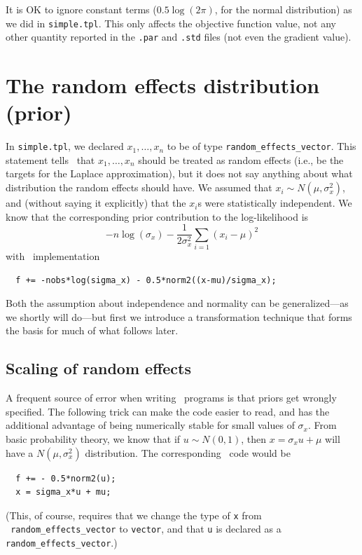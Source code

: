 \documentclass{admbmanual}
\begin{document}
It is OK to ignore constant terms ($0.5\log(2\pi)$, for the normal distribution) as we did in \texttt{simple.tpl}.
This only affects the objective function value, not any other quantity reported in the \texttt{.par} and \texttt{.std} files
(not even the gradient value).


\section{The random effects distribution (prior)}

In \texttt{simple.tpl}, we declared $x_{1},\ldots ,x_{n}$ to be of type \texttt{random\_effects\_vector}. This
statement tells \scAB\ that $x_{1},\ldots ,x_{n}$ should be treated as random effects (i.e., be the targets for the
Laplace approximation), but it does not say anything about what distribution the random effects should have. 
We assumed that $x_i\sim N(\mu ,\sigma_{x}^{2})$, and (without saying it explicitly)
that the $x_i$s were statistically independent. We know that the corresponding prior contribution to the
log-likelihood is
\[
-n\log (\sigma_{x})-\frac{1}{2\sigma_x^2}\sum_{i=1}\left( x_i-\mu \right) ^{2}
\]
with \scAB\ implementation
\begin{lstlisting}
  f += -nobs*log(sigma_x) - 0.5*norm2((x-mu)/sigma_x);
\end{lstlisting}
Both the assumption about independence and normality can be generalized---as we shortly will do---but first we introduce a transformation technique that forms the basis for much of what follows later.


\subsection{Scaling of random effects}

A frequent source of error when writing \scAR\ programs is that priors get
wrongly specified. The following trick can make the code easier to read, and
has the additional advantage of being numerically stable for small values of
$\sigma_{x}$. From basic probability theory, we know that if $u\sim N(0,1)$,
then $x=\sigma_{x}u+\mu$ will have a $N(\mu ,\sigma_{x}^{2})$ distribution.
The corresponding \scAB\ code would be
\begin{lstlisting}
  f += - 0.5*norm2(u);
  x = sigma_x*u + mu;
\end{lstlisting}
(This, of course, requires that we change the type of \texttt{x} from \texttt{\ random\_effects\_vector} to
\texttt{vector}, and that \texttt{u} is declared as a \texttt{random\_effects\_vector}.) 
\end{document}
